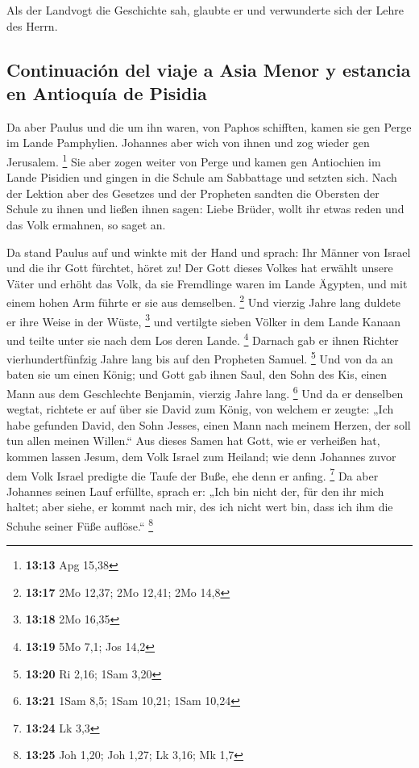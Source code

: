  Als der Landvogt die Geschichte sah, glaubte er und
verwunderte sich der Lehre des Herrn.

\hypertarget{continuaciuxf3n-del-viaje-a-asia-menor-y-estancia-en-antioquuxeda-de-pisidia}{%
\subsection{Continuación del viaje a Asia Menor y estancia en Antioquía
de
Pisidia}\label{continuaciuxf3n-del-viaje-a-asia-menor-y-estancia-en-antioquuxeda-de-pisidia}}

 Da aber Paulus und die um ihn waren, von Paphos
schifften, kamen sie gen Perge im Lande Pamphylien. Johannes aber wich
von ihnen und zog wieder gen Jerusalem. \footnote{\textbf{13:13} Apg
  15,38}  Sie aber zogen weiter von Perge und kamen gen
Antiochien im Lande Pisidien und gingen in die Schule am Sabbattage und
setzten sich.  Nach der Lektion aber des Gesetzes und der
Propheten sandten die Obersten der Schule zu ihnen und ließen ihnen
sagen: Liebe Brüder, wollt ihr etwas reden und das Volk ermahnen, so
saget an.

 Da stand Paulus auf und winkte mit der Hand und sprach:
Ihr Männer von Israel und die ihr Gott fürchtet, höret zu!
 Der Gott dieses Volkes hat erwählt unsere Väter und
erhöht das Volk, da sie Fremdlinge waren im Lande Ägypten, und mit einem
hohen Arm führte er sie aus demselben. \footnote{\textbf{13:17} 2Mo
  12,37; 2Mo 12,41; 2Mo 14,8}  Und vierzig Jahre lang
duldete er ihre Weise in der Wüste, \footnote{\textbf{13:18} 2Mo 16,35}
 und vertilgte sieben Völker in dem Lande Kanaan und
teilte unter sie nach dem Los deren Lande. \footnote{\textbf{13:19} 5Mo
  7,1; Jos 14,2}  Darnach gab er ihnen Richter
vierhundertfünfzig Jahre lang bis auf den Propheten Samuel. \footnote{\textbf{13:20}
  Ri 2,16; 1Sam 3,20}  Und von da an baten sie um einen
König; und Gott gab ihnen Saul, den Sohn des Kis, einen Mann aus dem
Geschlechte Benjamin, vierzig Jahre lang. \footnote{\textbf{13:21} 1Sam
  8,5; 1Sam 10,21; 1Sam 10,24}  Und da er denselben
wegtat, richtete er auf über sie David zum König, von welchem er zeugte:
„Ich habe gefunden David, den Sohn Jesses, einen Mann nach meinem
Herzen, der soll tun allen meinen Willen.``  Aus dieses
Samen hat Gott, wie er verheißen hat, kommen lassen Jesum, dem Volk
Israel zum Heiland;  wie denn Johannes zuvor dem Volk
Israel predigte die Taufe der Buße, ehe denn er anfing. \footnote{\textbf{13:24}
  Lk 3,3}  Da aber Johannes seinen Lauf erfüllte, sprach
er: „Ich bin nicht der, für den ihr mich haltet; aber siehe, er kommt
nach mir, des ich nicht wert bin, dass ich ihm die Schuhe seiner Füße
auflöse.`` \footnote{\textbf{13:25} Joh 1,20; Joh 1,27; Lk 3,16; Mk 1,7}

